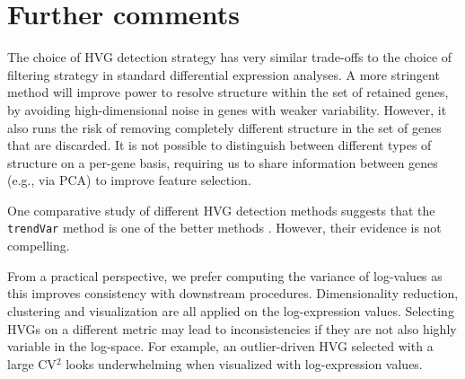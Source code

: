 \documentclass{article}
\newcommand\code[1]{{\small\texttt{#1}}}
\begin{document}
\section{Further comments}
The choice of HVG detection strategy has very similar trade-offs to the choice of filtering strategy in standard differential expression analyses.
A more stringent method will improve power to resolve structure within the set of retained genes, by avoiding high-dimensional noise in genes with weaker variability.
However, it also runs the risk of removing completely different structure in the set of genes that are discarded.
It is not possible to distinguish between different types of structure on a per-gene basis,
requiring us to share information between genes (e.g., via PCA) to improve feature selection.

One comparative study of different HVG detection methods suggests that the \code{trendVar} method is one of the better methods \citep{yip2018evaluation}.
However, their evidence is not compelling.

From a practical perspective, we prefer computing the variance of log-values as this improves consistency with downstream procedures.
Dimensionality reduction, clustering and visualization are all applied on the log-expression values.
Selecting HVGs on a different metric may lead to inconsistencies if they are not also highly variable in the log-space.
For example, an outlier-driven HVG selected with a large CV$^2$ looks underwhelming when visualized with log-expression values.



\end{document}
